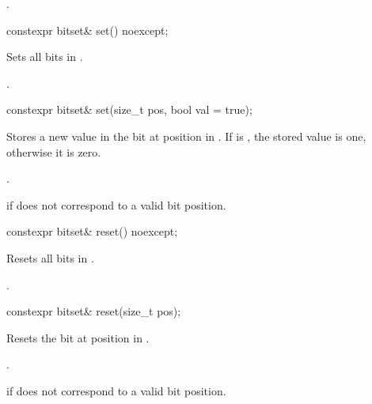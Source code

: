 \begin{itemdescr}
\pnum
\returns
{}.
\end{itemdescr}

%
%
\begin{itemdecl}
constexpr bitset& set() noexcept;
\end{itemdecl}

\begin{itemdescr}
\pnum
\effects
Sets all bits in
.

\pnum
\returns
{}.
\end{itemdescr}

%
%
\begin{itemdecl}
constexpr bitset& set(size_t pos, bool val = true);
\end{itemdecl}

\begin{itemdescr}
\pnum
\effects
Stores a new value in the bit at position  in
.
If  is , the stored value is one, otherwise it is zero.

\pnum
\returns
{}.

\pnum
\throws
{}%
 if  does not correspond to a valid bit position.
\end{itemdescr}

%
\begin{itemdecl}
constexpr bitset& reset() noexcept;
\end{itemdecl}

\begin{itemdescr}
\pnum
\effects
Resets all bits in
.

\pnum
\returns
{}.
\end{itemdescr}

%
\begin{itemdecl}
constexpr bitset& reset(size_t pos);
\end{itemdecl}

\begin{itemdescr}
\pnum
\effects
Resets the bit at position  in
.

\pnum
\returns
{}.

\pnum
\throws
{}%
 if  does not correspond to a valid bit position.
\end{itemdescr}

